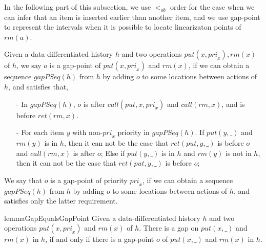 In the following part of this subsection, we use $<_{\textit{ob}}$ order for the case when we can infer that an item is inserted earlier than another item, and we use gap-point to represent the intervals when it is possible to locate linearizaton points of $\textit{rm}(a)$.

\begin{definition}\label{def:gap-point for matched put and rm operations}

Given a data-differentiated history $h$ and two operations $\textit{put}(x,\textit{pri}_x),\textit{rm}(x)$ of $h$, we say $o$ is a gap-point of $\textit{put}(x,\textit{pri}_x)$ and $\textit{rm}(x)$, if we can obtain a sequence $\textit{gapPSeq}(h)$ from $h$ by adding $o$ to some locations between actions of $h$, and satisfies that,

\begin{itemize}
\setlength{\itemsep}{0.5pt}
\item[-] In $\textit{gapPSeq}(h)$, $o$ is after $\textit{call}(\textit{put},x,\textit{pri}_x)$ and $\textit{call}(\textit{rm},x)$, and is before $\textit{ret}(\textit{rm},x)$.
\item[-] For each item $y$ with non-$\textit{pri}_x$ priority in $\textit{gapPSeq}(h)$. If $\textit{put}(y,\_)$ and $\textit{rm}(y)$ is in $h$, then it can not be the case that $\textit{ret}(\textit{put},y,\_)$ is before $o$ and $\textit{call}(\textit{rm},x)$ is after $o$; Else if $\textit{put}(y,\_)$ is in $h$ and $\textit{rm}(y)$ is not in $h$, then it can not be the case that $\textit{ret}(\textit{put},y,\_)$ is before $o$;
\end{itemize}

We say that $o$ is a gap-point of priority $\textit{pri}_x$, if we can obtain a sequence $\textit{gapPSeq}(h)$ from $h$ by adding $o$ to some locations between actions of $h$, and satisfies only the latter requirement.
\end{definition}




\begin{restatable}{lemma}{GapEqualsGapPoint}
\label{lemma:gap eqals the existence of gap point}
Given a data-differentiated history $h$ and two operations $\textit{put}(x,\textit{pri}_x)$ and $\textit{rm}(x)$ of $h$. There is a gap on $\textit{put}(x,\_)$ and $\textit{rm}(x)$ in $h$, if and only if there is a gap-point $o$ of $\textit{put}(x,\_)$ and $\textit{rm}(x)$ in $h$.
\end{restatable}

